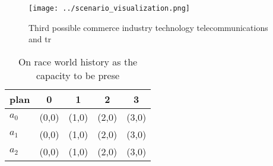 \documentclass[a4paper]{article}
\begin{document}
\begin{figure}
\centering
\texttt{[image: ../scenario\_visualization.png]}
\caption{Third possible commerce industry technology telecommunications and tr
}
\end{figure}
 
\begin{table}
\begin{adjustbox}{width=0.6\columnwidth}
\begin{tabular}{|l|l|l|l|l|}
\hline
\textbf{plan} & \multicolumn{1}{c|}{\textbf{0}} & \multicolumn{1}{c|}{\textbf{1}} & \multicolumn{1}{c|}{\textbf{2}} & \multicolumn{1}{c|}{\textbf{3}} \\ \hline
\textbf{$a_0$}  & (0,0) & (1,0) & (2,0) & (3,0) \\ \hline
\textbf{$a_1$}  & (0,0) & (1,0) & (2,0) & (3,0) \\ \hline
\textbf{$a_2$}  & (0,0) & (1,0) & (2,0) & (3,0) \\ \hline
\end{tabular}
\end{adjustbox}
\caption{On race world history as the capacity to be prese
}
\end{table}
\end{document}
